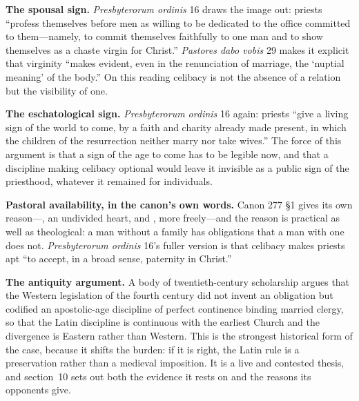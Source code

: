 \textbf{The spousal sign.} \emph{Presbyterorum ordinis} 16 draws the image out: priests ``profess themselves before men as willing to be dedicated to the office committed to them---namely, to commit themselves faithfully to one man and to show themselves as a chaste virgin for Christ.'' \emph{Pastores dabo vobis} 29 makes it explicit that virginity ``makes evident, even in the renunciation of marriage, the `nuptial meaning' of the body.'' On this reading celibacy is not the absence of a relation but the visibility of one.

\textbf{The eschatological sign.} \emph{Presbyterorum ordinis} 16 again: priests ``give a living sign of the world to come, by a faith and charity already made present, in which the children of the resurrection neither marry nor take wives.'' The force of this argument is that a sign of the age to come has to be legible now, and that a discipline making celibacy optional would leave it invisible as a public sign of the priesthood, whatever it remained for individuals.

\textbf{Pastoral availability, in the canon's own words.} Canon 277 §1 gives its own reason---, an undivided heart, and , more freely---and the reason is practical as well as theological: a man without a family has obligations that a man with one does not. \emph{Presbyterorum ordinis} 16's fuller version is that celibacy makes priests apt ``to accept, in a broad sense, paternity in Christ.''

\textbf{The antiquity argument.} A body of twentieth-century scholarship argues that the Western legislation of the fourth century did not invent an obligation but codified an apostolic-age discipline of perfect continence binding married clergy, so that the Latin discipline is continuous with the earliest Church and the divergence is Eastern rather than Western. This is the strongest historical form of the case, because it shifts the burden: if it is right, the Latin rule is a preservation rather than a medieval imposition. It is a live and contested thesis, and section~10 sets out both the evidence it rests on and the reasons its opponents give.

